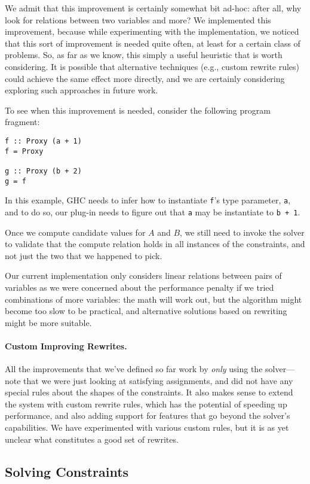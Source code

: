 \documentclass{sigplanconf}
\begin{document}
We admit that this improvement is certainly somewhat bit ad-hoc: after all,
why look for relations between two variables and more?  We implemented
this improvement, because while experimenting with the implementation,
we noticed that this sort of improvement is needed quite often,
at least for a certain class of problems.  So, as far as we know, this
simply a useful heuristic that is worth considering.  It is possible
that alternative techniques (e.g., custom rewrite rules) could achieve
the same effect more directly, and we are certainly considering exploring
such approaches in future work.

To see when this improvement is needed, consider the following program
fragment:
\begin{Verbatim}
f :: Proxy (a + 1)
f = Proxy

g :: Proxy (b + 2)
g = f
\end{Verbatim}
In this example, GHC needs to infer how to instantiate \Verb"f"'s type
parameter, \Verb"a", and to do so, our plug-in needs to figure out that
\Verb"a" may be instantiate to \Verb"b + 1".

Once we compute candidate values for $A$ and $B$, we still need to
invoke the solver to validate that the compute relation holds in all
instances of the constraints, and not just the two that we happened to pick.

Our current implementation only considers linear relations between pairs
of variables as we were concerned about the performance penalty if
we tried combinations of more variables: the math will work out, but
the algorithm might become too slow to be practical, and alternative
solutions based on rewriting might be more suitable.


\paragraph{Custom Improving Rewrites.}
All the improvements that we've defined so far work by {\em only} using
the solver---note that we were just looking at satisfying assignments,
and did not have any special rules about the shapes of the constraints.
It also makes sense to extend the system with custom rewrite rules,
which has the potential of speeding up performance, and also adding
support for features that go beyond the solver's capabilities.
We have experimented with various custom rules, but it is as yet
unclear what constitutes a good set of rewrites.


\subsection{Solving Constraints}
\end{document}
